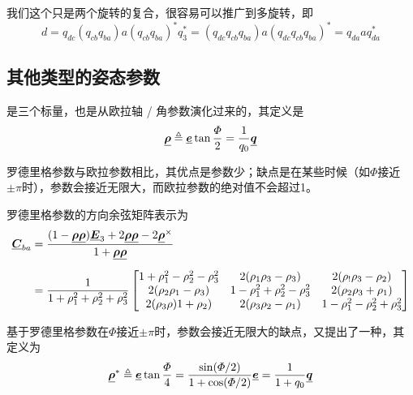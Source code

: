 \warn
[
\textbf{\large 旋转顺序与四元数乘法顺序}\\
\hspace*{1.8em} 我们先进行的是$q_{ba}$变换，再进行$q_{cb}$变换，其对应的四元数乘法为$q_{ca} = q_{cb} \cdot q_{ba}$，即先进行的变换放在后面，对于多旋转来说也符合这个计算顺序。
]

我们这个只是两个旋转的复合，很容易可以推广到多旋转，即
\begin{equation}
	d = q_{dc}(q_{cb} q_{ba}) a (q_{cb} q_{ba})^*q_3^* = (q_{dc} q_{cb} q_{ba}) a (q_{dc} q_{cb} q_{ba})^* = q_{da} a q_{da}^*
\end{equation}


\subsection{其他类型的姿态参数}


是三个标量，也是从欧拉轴 / 角参数演化过来的，其定义是
\begin{equation}
	\underline{\bm{\rho}} \triangleq \underline{\bm{e}} \tan \dfrac{\varPhi}{2} = \dfrac{1}{q_0} \underline{\bm{q}}
\end{equation}

罗德里格参数与欧拉参数相比，其优点是参数少；缺点是在某些时候（如$\varPhi$接近$\pm \pi$时），参数会接近无限大，而欧拉参数的绝对值不会超过1。

罗德里格参数的方向余弦矩阵表示为
\begin{align}
	\underline{\bm{C}}_{ba} &= 
	\dfrac{(1 - \underline{\bm{\rho}}\underline{\bm{\rho}})\underline{\bm{E}}_3 + 2 \underline{\bm{\rho}} \underline{\bm{\rho}} - 2 \underline{\bm{\rho}}^\times}{1 + \underline{\bm{\rho}}\underline{\bm{\rho}} } \\[0.5em]
	&=
	\dfrac{1}{1 + \rho_1^2 + \rho_2^2 + \rho_3^2 }
	\begin{bmatrix}
		1 + \rho_1^2 - \rho_2^2 - \rho_3^2 & 2(\rho_1\rho_3 - \rho_3) & 2(\rho_!\rho_3 - \rho_2) \\
		2(\rho_2 \rho_1 - \rho_3) & 1 - \rho_1^2 + \rho_2^2 - \rho_3^2 &2(\rho_2 \rho_3 + \rho_1) \\
		2(\rho_3 \rho)1 + \rho_2) & 2(\rho_3\rho_2 - \rho_1) & 1 - \rho_1^2 - \rho_2^2 + \rho_3^2
	\end{bmatrix}
\end{align}
\vspace*{0.5em}


\sssection[修正的罗德里格参数]

基于罗德里格参数在$\varPhi$接近$\pm \pi$时，参数会接近无限大的缺点，又提出了一种，其定义为
\begin{equation}
	\underline{\bm{\rho}}^* \triangleq \underline{\bm{e}} \tan \dfrac{\varPhi}{4} = \dfrac{\sin (\varPhi / 2)}{1 + \cos (\varPhi / 2)} \underline{\bm{e}} = \dfrac{1}{1 + q_0} \underline{\bm{q}}
\end{equation}

